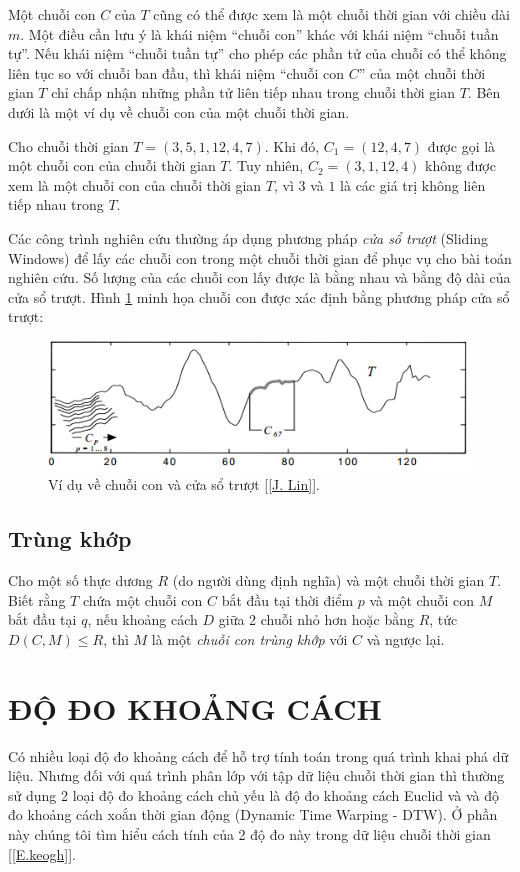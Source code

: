 \documentclass[13pt,oneside]{scrbook}
\begin{document}
Một chuỗi con $C$ của $T$ cũng có thể được xem là một chuỗi thời gian với chiều dài $m$. 
Một điều cần lưu ý là khái niệm “chuỗi con” khác với khái niệm “chuỗi tuần tự”. 
Nếu khái niệm “chuỗi tuần tự” cho phép các phần tử của chuỗi có thể không liên tục so với chuỗi ban đầu, thì khái niệm “chuỗi con $C$” của một chuỗi thời gian $T$ chỉ chấp nhận những phần tử liên tiếp nhau trong chuỗi thời gian $T$. 
Bên dưới là một ví dụ về chuỗi con của một chuỗi thời gian.

Cho chuỗi thời gian $T = (3, 5, 1, 12, 4, 7)$. 
Khi đó, $C_1 = (12, 4, 7)$ được gọi là một chuỗi con của chuỗi thời gian $T$. 
Tuy nhiên, $C_2 = (3, 1, 12, 4)$ không được xem là một chuỗi con của chuỗi thời gian $T$, vì $3$ và $1$ là các giá trị không liên tiếp nhau trong $T$.

Các công trình nghiên cứu thường áp dụng phương pháp \textit{cửa sổ trượt} (Sliding Windows) để lấy các chuỗi con trong một chuỗi thời gian để phục vụ cho bài toán nghiên cứu. 
Số lượng của các chuỗi con lấy được là bằng nhau và bằng độ dài của cửa sổ trượt. 
Hình \ref{chuoicon.png} minh họa chuỗi con được xác định bằng phương pháp cửa sổ trượt:

\begin{figure}
	\begin{center}
		\includegraphics[width=120mm]{chuoicon.png}
		\caption{Ví dụ về chuỗi con và cửa sổ trượt [\ref{J. Lin}].}
		\label{chuoicon.png}
	\end{center}
\end{figure}
\subsection{Trùng khớp}
Cho một số thực dương $R$ (do người dùng định nghĩa) và một chuỗi thời gian $T$.
Biết rằng $T$ chứa một chuỗi con $C$ bắt đầu tại thời điểm $p$ và một chuỗi con $M$ bắt đầu tại $q$, nếu khoảng cách $D$ giữa 2 chuỗi nhỏ hơn hoặc bằng $R$, tức $D(C, M) \leq R$, thì $M$
là một \textit{chuỗi con trùng khớp} với $C$ và ngược lại.
\section{ĐỘ ĐO KHOẢNG CÁCH}
Có nhiều loại độ đo khoảng cách để hỗ trợ tính toán trong quá trình khai phá dữ liệu. 
Nhưng đối với quá trình phân lớp với tập dữ liệu chuỗi thời gian thì thường sử dụng 2 loại độ đo khoảng cách chủ yếu là độ đo khoảng cách Euclid và và độ đo khoảng cách xoắn thời gian động (Dynamic Time Warping -  DTW). 
Ở phần này chúng tôi tìm hiểu cách tính của 2 độ đo này trong dữ liệu chuỗi thời gian [\ref{E.keogh}].
\end{document}
